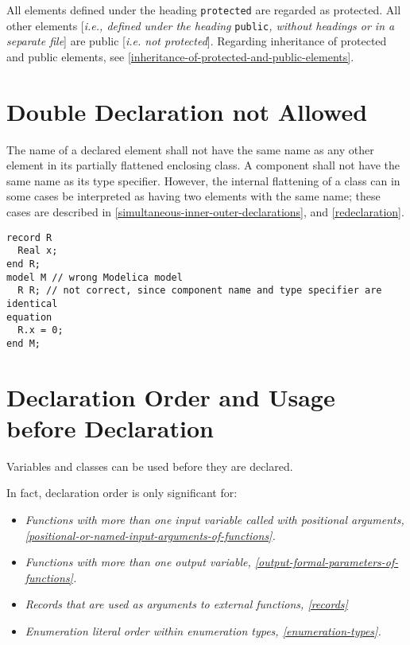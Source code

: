All elements defined under the heading \lstinline!protected! are regarded as
protected. All other elements {[}\emph{i.e., defined under the heading}
\lstinline!public!\emph{, without headings or in a separate file}{]} are public
{[}\emph{i.e. not protected}{]}. Regarding inheritance of protected and
public elements, see \autoref{inheritance-of-protected-and-public-elements}.

\section{Double Declaration not Allowed}

The name of a declared element shall not have the same name as any other
element in its partially flattened enclosing class. A component shall
not have the same name as its type specifier. However, the internal
flattening of a class can in some cases be interpreted as having two
elements with the same name; these cases are described in \autoref{simultaneous-inner-outer-declarations},
and \autoref{redeclaration}.

\begin{example}
\begin{lstlisting}[language=modelica]
record R
  Real x;
end R;
model M // wrong Modelica model
  R R; // not correct, since component name and type specifier are identical
equation
  R.x = 0;
end M;
\end{lstlisting}
\end{example}

\section{Declaration Order and Usage before Declaration}

Variables and classes can be used before they are declared.

\begin{nonnormative}
In fact, declaration order is only significant for:
\begin{itemize}
\item
  \emph{Functions with more than one input variable called with
  positional arguments, \autoref{positional-or-named-input-arguments-of-functions}.}
\item
  \emph{Functions with more than one output variable, \autoref{output-formal-parameters-of-functions}.}
\item
  \emph{Records that are used as arguments to external functions,
  \autoref{records}}
\item
  \emph{Enumeration literal order within enumeration types, \autoref{enumeration-types}.}
\end{itemize}
\end{nonnormative}

